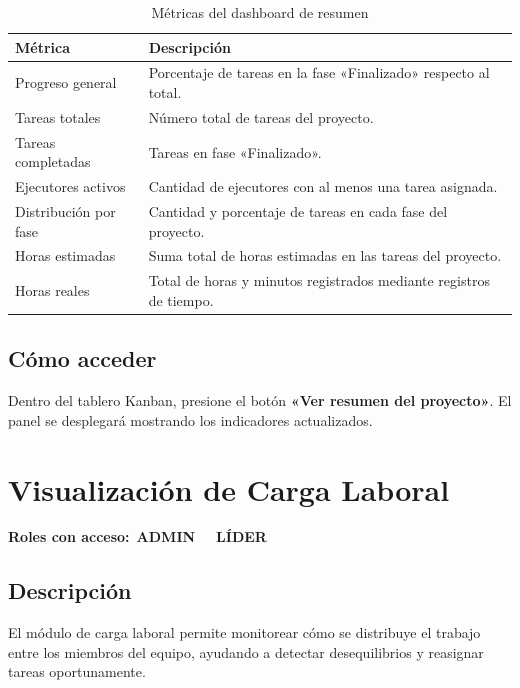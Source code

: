 \documentclass[12pt, a4paper]{article}
\newcommand{\rolbadge}[2]{%
  \colorbox{#1}{\color{white}\footnotesize\bfseries\,#2\,}%
}
\newcommand{\admin}{\rolbadge{admincolor}{ADMIN}}
\newcommand{\leader}{\rolbadge{leadercolor}{LÍDER}}
\begin{document}
\begin{table}[H]
\centering
\begin{tabularx}{\textwidth}{L{4.5cm} L{9cm}}
\toprule
\textbf{Métrica} & \textbf{Descripción} \\
\midrule
Progreso general &
  Porcentaje de tareas en la fase «Finalizado» respecto al total. \\
\addlinespace
Tareas totales &
  Número total de tareas del proyecto. \\
\addlinespace
Tareas completadas &
  Tareas en fase «Finalizado». \\
\addlinespace
Ejecutores activos &
  Cantidad de ejecutores con al menos una tarea asignada. \\
\addlinespace
Distribución por fase &
  Cantidad y porcentaje de tareas en cada fase del proyecto. \\
\addlinespace
Horas estimadas &
  Suma total de horas estimadas en las tareas del proyecto. \\
\addlinespace
Horas reales &
  Total de horas y minutos registrados mediante registros de tiempo. \\
\bottomrule
\end{tabularx}
\caption{Métricas del dashboard de resumen}
\end{table}

\subsection{Cómo acceder}

Dentro del tablero Kanban, presione el botón \textbf{«Ver resumen del proyecto»}. El panel se desplegará mostrando los indicadores actualizados.

\section{Visualización de Carga Laboral}

\begin{notebox}
\textbf{Roles con acceso:} \admin\ \leader
\end{notebox}

\subsection{Descripción}

El módulo de carga laboral permite monitorear cómo se distribuye el trabajo entre los miembros del equipo, ayudando a detectar desequilibrios y reasignar tareas oportunamente.
\end{document}
